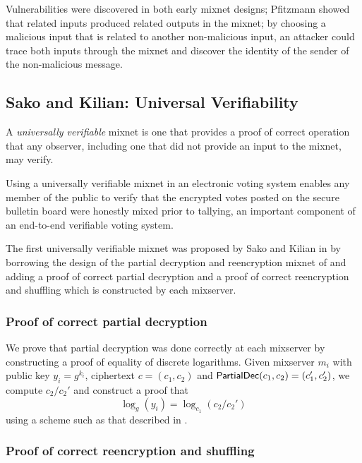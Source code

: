 Vulnerabilities were discovered in both early mixnet designs; Pfitzmann \cite{pfitzmann90, pfitzmann95} showed that related inputs produced related outputs in the mixnet; by choosing a malicious input that is related to another non-malicious input, an attacker could trace both inputs through the mixnet and discover the identity of the sender of the non-malicious message.

\subsection{Sako and Kilian: Universal Verifiability}

\begin{definition}
A \emph{universally verifiable} mixnet is one that provides a proof of correct operation that any observer, including one that did not provide an input to the mixnet, may verify.
\end{definition}

Using a universally verifiable mixnet in an electronic voting system enables any member of the public to verify that the encrypted votes posted on the secure bulletin board were honestly mixed prior to tallying, an important component of an end-to-end verifiable voting system.

The first universally verifiable mixnet was proposed by Sako and Kilian in \cite{sako95} by borrowing the design of the partial decryption and reencryption mixnet of \cite{park94} and adding a proof of correct partial decryption and a proof of correct reencryption and shuffling which is constructed by each mixserver.

\subsubsection{Proof of correct partial decryption}

We prove that partial decryption was done correctly at each mixserver by constructing a proof of equality of discrete logarithms. Given mixserver $m_i$ with public key $y_i = g^{k_i}$, ciphertext $c = (c_1, c_2)$ and $\operatorname{\mathsf{PartialDec}}(c_1, c_2) = (c_1', c_2')$, we compute $c_2 / c_2'$ and construct a proof that
$$\log_{g}(y_i) = \log_{c_1}(c_2 / c_2')$$
using a scheme such as that described in \cite{chaum-pedersen}.

\subsubsection{Proof of correct reencryption and shuffling}

